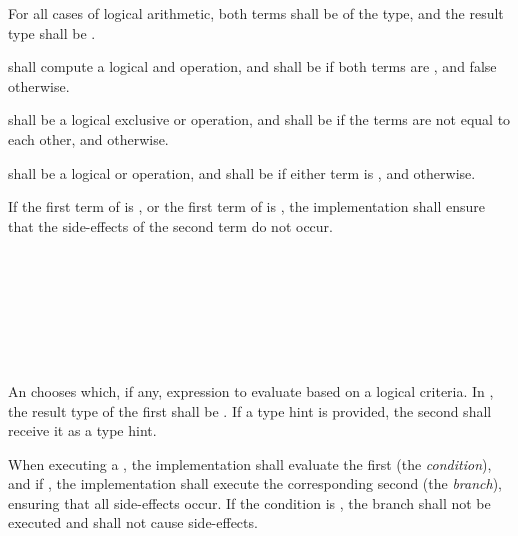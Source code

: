 \specsubsubitem
For all cases of logical arithmetic, both terms shall be of the 
type, and the result type shall be .

\specsubsubitem
\terminal{\&\&} shall compute a logical and operation, and shall be
 if both terms are , and false otherwise.

\specsubsubitem
\terminal{\textasciicircum\textasciicircum} shall be a logical exclusive or
operation, and shall be  if the terms are not equal to each
other, and  otherwise.

\specsubsubitem
\terminal{||} shall be a logical or operation, and shall be  if
either term is , and  otherwise.

\specsubsubitem
If the first term of  is ,
or the first term of  is ,
the implementation shall ensure that the side-effects of the second term do not
occur.


\begin{grammar}
 \\
	  \\
	    \\
	    \\

 \\
	\terminal{(}  \terminal{)}  \\
\end{grammar}

\specsubsubitem
An  chooses which, if any, expression to evaluate
based on a logical criteria. In , the result type of
the first  shall be . If a type hint is provided,
the second  shall receive it as a type hint.

\specsubsubitem
When executing a , the implementation shall
evaluate the first  (the \textit{condition}), and if
, the implementation shall execute the corresponding second
 (the \textit{branch}), ensuring that all side-effects
occur. If the condition is , the branch shall not be executed
and shall not cause side-effects.

